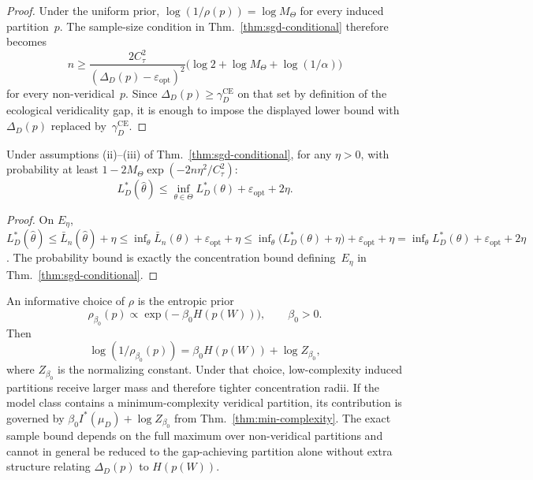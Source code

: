 \documentclass[twoside,11pt]{article}
\newcommand{\CE}{\mathrm{CE}}
\newcommand{\thmref}[1]{Thm.~\ref{#1}}
\begin{document}
\begin{proof}
Under the uniform prior, $\log(1/\rho(p))=\log M_\Theta$ for every induced partition~$p$. The sample-size condition in \thmref{thm:sgd-conditional} therefore becomes
\[
n \ge \frac{2C_\tau^2}{(\Delta_D(p)-\varepsilon_{\mathrm{opt}})^2}
\bigl(\log 2+\log M_\Theta+\log(1/\alpha)\bigr)
\]
for every non-veridical~$p$. Since $\Delta_D(p)\ge \gamma_D^{\CE}$ on that set by definition of the ecological veridicality gap, it is enough to impose the displayed lower bound with $\Delta_D(p)$ replaced by~$\gamma_D^{\CE}$.
\end{proof}

\begin{corollary}\label{cor:sgd-near}
Under assumptions (ii)--(iii) of \thmref{thm:sgd-conditional}, for any $\eta>0$, with probability at least $1-2M_\Theta\exp(-2n\eta^2/C_\tau^2)$:
\[
L_D^*(\hat\theta) \le \inf_{\theta\in\Theta} L_D^*(\theta) + \varepsilon_{\mathrm{opt}} + 2\eta.
\]
\end{corollary}

\begin{proof}
On $E_\eta$,
$L_D^*(\hat\theta)\le \bar L_n(\hat\theta)+\eta
\le \inf_{\theta}\bar L_n(\theta)+\varepsilon_{\mathrm{opt}}+\eta
\le \inf_{\theta}\bigl(L_D^*(\theta)+\eta\bigr)+\varepsilon_{\mathrm{opt}}+\eta
= \inf_{\theta}L_D^*(\theta)+\varepsilon_{\mathrm{opt}}+2\eta$.
The probability bound is exactly the concentration bound defining~$E_\eta$ in \thmref{thm:sgd-conditional}.
\end{proof}

An informative choice of $\rho$ is the entropic prior
\[
\rho_{\beta_0}(p)
\propto \exp\bigl(-\beta_0 H(p(W))\bigr),
\qquad
\beta_0 > 0.
\]
Then
\[
\log(1/\rho_{\beta_0}(p))
= \beta_0 H(p(W)) + \log Z_{\beta_0},
\]
where $Z_{\beta_0}$ is the normalizing constant. Under that choice, low-complexity induced partitions receive larger mass and therefore tighter concentration radii. If the model class contains a minimum-complexity veridical partition, its contribution is governed by $\beta_0 I^*(\mu_D)+\log Z_{\beta_0}$ from \thmref{thm:min-complexity}. The exact sample bound depends on the full maximum over non-veridical partitions and cannot in general be reduced to the gap-achieving partition alone without extra structure relating $\Delta_D(p)$ to $H(p(W))$.
\end{document}
